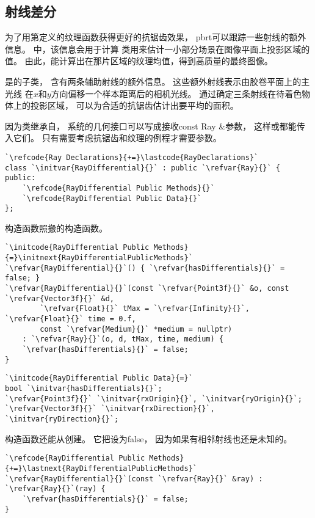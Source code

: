 \subsection{射线差分}\label{sub:射线差分}
为了用第定义的纹理函数获得更好的抗锯齿效果，
pbrt可以跟踪一些射线的额外信息。
中，该信息会用于计算
类用来估计一小部分场景在图像平面上投影区域的值。
由此，能计算出在那片区域的纹理均值，得到高质量的最终图像。

是的子类，
含有两条辅助射线的额外信息。
这些额外射线表示由胶卷平面上的主光线
在$x$和$y$方向偏移一个样本距离后的相机光线。
通过确定三条射线在待着色物体上的投影区域，
可以为合适的抗锯齿估计出要平均的面积。

因为类继承自，
系统的几何接口可以写成接收{\ttfamily const Ray \&}参数，
这样或都能传入它们。
只有需要考虑抗锯齿和纹理的例程才需要参数。
\begin{lstlisting}
`\refcode{Ray Declarations}{+=}\lastcode{RayDeclarations}`
class `\initvar{RayDifferential}{}` : public `\refvar{Ray}{}` {
public:
    `\refcode{RayDifferential Public Methods}{}`
    `\refcode{RayDifferential Public Data}{}`
};
\end{lstlisting}

构造函数照搬的构造函数。
\begin{lstlisting}
`\initcode{RayDifferential Public Methods}{=}\initnext{RayDifferentialPublicMethods}`
`\refvar{RayDifferential}{}`() { `\refvar{hasDifferentials}{}` = false; }
`\refvar{RayDifferential}{}`(const `\refvar{Point3f}{}` &o, const `\refvar{Vector3f}{}` &d,
        `\refvar{Float}{}` tMax = `\refvar{Infinity}{}`, `\refvar{Float}{}` time = 0.f,
        const `\refvar{Medium}{}` *medium = nullptr)
    : `\refvar{Ray}{}`(o, d, tMax, time, medium) {
    `\refvar{hasDifferentials}{}` = false; 
}
\end{lstlisting}

\begin{lstlisting}
`\initcode{RayDifferential Public Data}{=}`
bool `\initvar{hasDifferentials}{}`;
`\refvar{Point3f}{}` `\initvar{rxOrigin}{}`, `\initvar{ryOrigin}{}`;
`\refvar{Vector3f}{}` `\initvar{rxDirection}{}`, `\initvar{ryDirection}{}`;
\end{lstlisting}

构造函数还能从创建。
它把设为{\ttfamily false}，
因为如果有相邻射线也还是未知的。
\begin{lstlisting}
`\refcode{RayDifferential Public Methods}{+=}\lastnext{RayDifferentialPublicMethods}`
`\refvar{RayDifferential}{}`(const `\refvar{Ray}{}` &ray) : `\refvar{Ray}{}`(ray) {
    `\refvar{hasDifferentials}{}` = false; 
}
\end{lstlisting}

